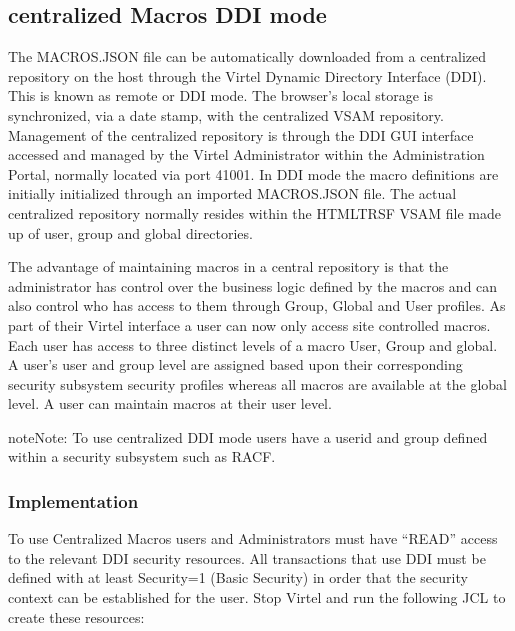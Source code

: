 \documentclass[letterpaper,10pt,english]{sphinxmanual}
\begin{document}
\ignorespaces 

\subsection{centralized Macros \sphinxhyphen{} DDI mode}
\label{\detokenize{Customization:centralized-macros-ddi-mode}}\label{\detokenize{Customization:index-79}}
\sphinxAtStartPar
The MACROS.JSON file can be automatically downloaded from a centralized repository on the host through the Virtel Dynamic Directory Interface (DDI). This is known as remote or DDI mode. The browser’s local storage is synchronized, via a date stamp, with the centralized VSAM repository. Management of the centralized repository is through the DDI GUI interface accessed and managed by the Virtel Administrator within the Administration Portal, normally located via port 41001. In DDI mode the macro definitions are initially initialized through an imported MACROS.JSON file. The actual centralized repository normally resides within the HTMLTRSF VSAM file made up of user, group and global directories.

\sphinxAtStartPar
The advantage of maintaining macros in a central repository is that the administrator has control over the business logic defined by the macros and can also control who has access to them through Group, Global and User profiles. As part of their Virtel interface a user can now only access site controlled macros. Each user has access to three distinct levels of a macro \sphinxhyphen{} User, Group and global. A user’s user and group level are assigned based upon their corresponding security subsystem security profiles whereas all macros are available at the global level. A user can maintain macros at their user level.

\begin{sphinxadmonition}{note}{Note:}
\sphinxAtStartPar
To use centralized DDI mode users have a userid and group defined within a security subsystem such as RACF.
\end{sphinxadmonition}

\ignorespaces 

\subsubsection{Implementation}
\label{\detokenize{Customization:implementation}}\label{\detokenize{Customization:index-80}}
\sphinxAtStartPar
To use Centralized Macros users and Administrators must have “READ” access to the relevant DDI security resources. All transactions that use DDI must be defined with at least Security=1 (Basic Security) in order that the security context can be established for the user.  Stop Virtel and run the following JCL to create these resources:
\end{document}

